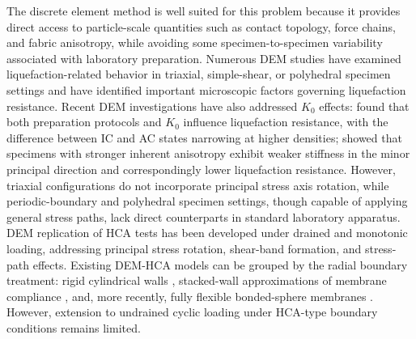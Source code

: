 \documentclass[a4paper,fleqn]{cas-sc}
\newcommand{\Kzero}{\ensuremath{K_0}}
\begin{document}
The discrete element method \citep[DEM;][]{Cundall1979} is well suited for this problem because it provides direct access to particle-scale quantities such as contact topology, force chains, and fabric anisotropy, while avoiding some specimen-to-specimen variability associated with laboratory preparation. Numerous DEM studies have examined liquefaction-related behavior in triaxial, simple-shear, or polyhedral specimen settings \citep[e.g.,][]{Huang2018,Yang2021,Jiang2021,Morimoto2021,WuYang2022,Xie2023,YangHuang2023,Zhang2023} and have identified important microscopic factors governing liquefaction resistance. Recent DEM investigations have also addressed \Kzero{} effects: \citet{YangTaiebat2024} found that both preparation protocols and \Kzero{} influence liquefaction resistance, with the difference between IC and AC states narrowing at higher densities; \citet{Otsubo2022} showed that specimens with stronger inherent anisotropy exhibit weaker stiffness in the minor principal direction and correspondingly lower liquefaction resistance. However, triaxial configurations do not incorporate principal stress axis rotation, while periodic-boundary and polyhedral specimen settings, though capable of applying general stress paths, lack direct counterparts in standard laboratory apparatus. DEM replication of HCA tests has been developed under drained and monotonic loading, addressing principal stress rotation, shear-band formation, and stress-path effects. Existing DEM-HCA models can be grouped by the radial boundary treatment: rigid cylindrical walls \citep{Shi2021,Liu2021}, stacked-wall approximations of membrane compliance \citep{LiGuoZhang2014,LiZhangGutierrez2015,LiChenGutierrez2017}, and, more recently, fully flexible bonded-sphere membranes \citep{Song2024,Song2024suffusion}. However, extension to undrained cyclic loading under HCA-type boundary conditions remains limited.
\end{document}

